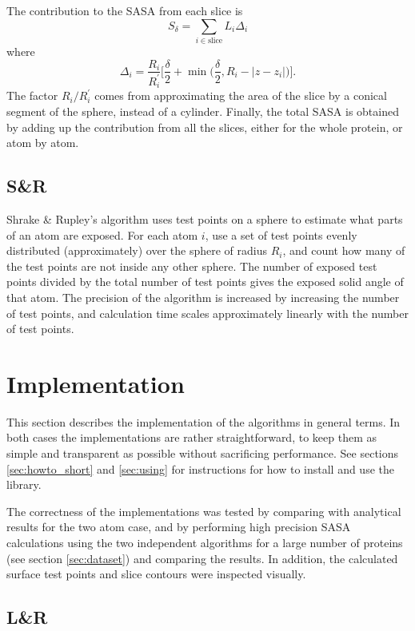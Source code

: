 \documentclass[a4paper,11pt]{article}
\begin{document}
\begin{small}
The contribution to the SASA from each slice is $$ S_\delta =
\sum_{i \in \text{slice}}L_i\Delta_i $$ where
$$
  \Delta_i = \frac{R_i}{R_i^\prime} \biggl[\frac{\delta}{2} 
    + \min\biggl(\frac{\delta}{2},R_i -
    \lvert z - z_i \rvert\biggr)\biggr]. 
$$ 
The factor $R_i/R_i^\prime$ comes from approximating the area of the
slice by a conical segment of the sphere, instead of a cylinder.
Finally, the total SASA is obtained by adding up the contribution from
all the slices, either for the whole protein, or atom by atom.

\subsection{S\&R}

Shrake \& Rupley's algorithm uses test points on a sphere to estimate
what parts of an atom are exposed. For each atom $i$, use a set of
test points evenly distributed (approximately) over the sphere of
radius $R_i$, and count how many of the test points are not inside any
other sphere. The number of exposed test points divided by the total
number of test points gives the exposed solid angle of that atom. The
precision of the algorithm is increased by increasing the number of
test points, and calculation time scales approximately linearly with
the number of test points.

\section{Implementation}\label{sec:imp}

This section describes the implementation of the algorithms in general
terms. In both cases the implementations are rather straightforward,
to keep them as simple and transparent as possible without sacrificing
performance. See sections \ref{sec:howto_short} and \ref{sec:using}
for instructions for how to install and use the library.

The correctness of the implementations was tested by comparing with
analytical results for the two atom case, and by performing high
precision SASA calculations using the two independent algorithms for a
large number of proteins (see section \ref{sec:dataset}) and comparing
the results. In addition, the calculated surface test
points and slice contours were inspected visually.

\subsection{L\&R}


\end{small}
\end{document}
